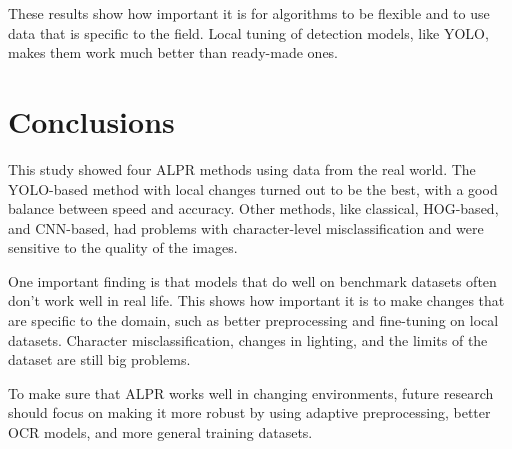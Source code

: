 \documentclass[runningheads]{llncs}
\begin{document}
These results show how important it is for algorithms to be flexible and to use data that is specific to the field. Local tuning of detection models, like YOLO, makes them work much better than ready-made ones.

\section{Conclusions}

This study showed four ALPR methods using data from the real world. The YOLO-based method with local changes turned out to be the best, with a good balance between speed and accuracy. Other methods, like classical, HOG-based, and CNN-based, had problems with character-level misclassification and were sensitive to the quality of the images.

One important finding is that models that do well on benchmark datasets often don't work well in real life. This shows how important it is to make changes that are specific to the domain, such as better preprocessing and fine-tuning on local datasets. Character misclassification, changes in lighting, and the limits of the dataset are still big problems.

To make sure that ALPR works well in changing environments, future research should focus on making it more robust by using adaptive preprocessing, better OCR models, and more general training datasets.


%
%
%


%
\end{document}
